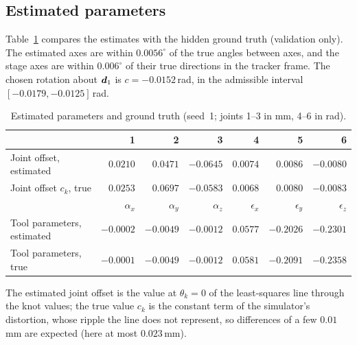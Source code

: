 \documentclass[../main.tex]{subfiles}
\begin{document}
\subsection{Estimated parameters}\label{sec:res-param}
Table~\ref{tab:res-param} compares the estimates with the hidden ground truth (validation only). The estimated axes are within $0.0056^\circ$ of the true angles between axes, and the stage axes are within $0.006^\circ$ of their true directions in the tracker frame. The chosen rotation about $\bm{d}_1$ is $c=-0.0152$\,rad, in the admissible interval $[-0.0179,-0.0125]$\,rad.

\begin{table}[H]
\centering\small
\caption{Estimated parameters and ground truth (seed~1; joints 1--3 in mm, 4--6 in rad).}\label{tab:res-param}
\begin{tabular}{@{}lrrrrrr@{}}
\toprule
 & 1 & 2 & 3 & 4 & 5 & 6 \\\midrule
Joint offset, estimated & $0.0210$ & $0.0471$ & $-0.0645$ & $0.0074$ & $0.0086$ & $-0.0080$ \\
Joint offset $c_k$, true & $0.0253$ & $0.0697$ & $-0.0583$ & $0.0068$ & $0.0080$ & $-0.0083$ \\\midrule
 & $\alpha_x$ & $\alpha_y$ & $\alpha_z$ & $\epsilon_x$ & $\epsilon_y$ & $\epsilon_z$ \\\midrule
Tool parameters, estimated & $-0.0002$ & $-0.0049$ & $-0.0012$ & $0.0577$ & $-0.2026$ & $-0.2301$ \\
Tool parameters, true & $-0.0001$ & $-0.0049$ & $-0.0012$ & $0.0581$ & $-0.2091$ & $-0.2358$ \\
\bottomrule
\end{tabular}
\end{table}
The estimated joint offset is the value at $\theta_k=0$ of the least-squares line through the knot values; the true value $c_k$ is the constant term of the simulator's distortion, whose ripple the line does not represent, so differences of a few $0.01$\,mm are expected (here at most $0.023$\,mm).
\end{document}
